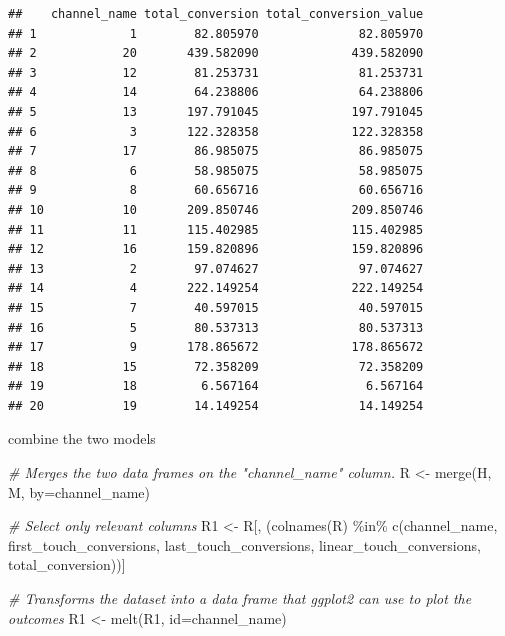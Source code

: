 \documentclass[
]{book}
\newenvironment{Shaded}{\begin{snugshade}}{\end{snugshade}}
\newcommand{\AttributeTok}[1]{\textcolor[rgb]{0.77,0.63,0.00}{#1}}
\newcommand{\CommentTok}[1]{\textcolor[rgb]{0.56,0.35,0.01}{\textit{#1}}}
\newcommand{\FunctionTok}[1]{\textcolor[rgb]{0.00,0.00,0.00}{#1}}
\newcommand{\NormalTok}[1]{#1}
\newcommand{\OtherTok}[1]{\textcolor[rgb]{0.56,0.35,0.01}{#1}}
\newcommand{\SpecialCharTok}[1]{\textcolor[rgb]{0.00,0.00,0.00}{#1}}
\newcommand{\StringTok}[1]{\textcolor[rgb]{0.31,0.60,0.02}{#1}}
\begin{document}
\begin{verbatim}
##    channel_name total_conversion total_conversion_value
## 1             1        82.805970              82.805970
## 2            20       439.582090             439.582090
## 3            12        81.253731              81.253731
## 4            14        64.238806              64.238806
## 5            13       197.791045             197.791045
## 6             3       122.328358             122.328358
## 7            17        86.985075              86.985075
## 8             6        58.985075              58.985075
## 9             8        60.656716              60.656716
## 10           10       209.850746             209.850746
## 11           11       115.402985             115.402985
## 12           16       159.820896             159.820896
## 13            2        97.074627              97.074627
## 14            4       222.149254             222.149254
## 15            7        40.597015              40.597015
## 16            5        80.537313              80.537313
## 17            9       178.865672             178.865672
## 18           15        72.358209              72.358209
## 19           18         6.567164               6.567164
## 20           19        14.149254              14.149254
\end{verbatim}

combine the two models

\begin{Shaded}
\begin{Highlighting}[]
\CommentTok{\# Merges the two data frames on the "channel\_name" column.}
\NormalTok{R }\OtherTok{\textless{}{-}} \FunctionTok{merge}\NormalTok{(H, M, }\AttributeTok{by=}\StringTok{\textquotesingle{}channel\_name\textquotesingle{}}\NormalTok{)}

\CommentTok{\# Select only relevant columns}
\NormalTok{R1 }\OtherTok{\textless{}{-}}\NormalTok{ R[, (}\FunctionTok{colnames}\NormalTok{(R) }\SpecialCharTok{\%in\%} \FunctionTok{c}\NormalTok{(}\StringTok{\textquotesingle{}channel\_name\textquotesingle{}}\NormalTok{, }\StringTok{\textquotesingle{}first\_touch\_conversions\textquotesingle{}}\NormalTok{, }\StringTok{\textquotesingle{}last\_touch\_conversions\textquotesingle{}}\NormalTok{, }\StringTok{\textquotesingle{}linear\_touch\_conversions\textquotesingle{}}\NormalTok{, }\StringTok{\textquotesingle{}total\_conversion\textquotesingle{}}\NormalTok{))]}

\CommentTok{\# Transforms the dataset into a data frame that ggplot2 can use to plot the outcomes}
\NormalTok{R1 }\OtherTok{\textless{}{-}} \FunctionTok{melt}\NormalTok{(R1, }\AttributeTok{id=}\StringTok{\textquotesingle{}channel\_name\textquotesingle{}}\NormalTok{)}
\end{Highlighting}
\end{Shaded}
\end{document}
